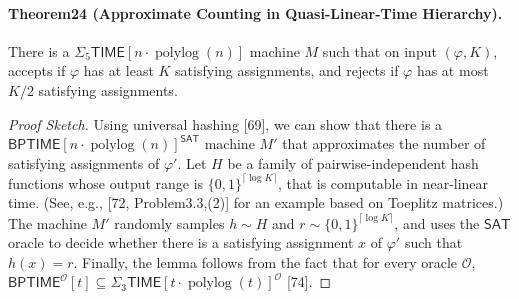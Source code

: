 \paragraph{Theorem24 (Approximate Counting in Quasi-Linear-Time Hierarchy).} There is a $\Sigma_5\mathsf{TIME}[n\cdot\operatorname{polylog}(n)]$ machine $M$ such that on input $(\varphi,K)$, accepts if $\varphi$ has at least $K$ satisfying assignments, and rejects if $\varphi$ has at most $K/2$ satisfying assignments.
\begin{proof}[Proof Sketch]
Using universal hashing [69], we can show that there is a $\mathsf{BPTIME}[n\cdot\operatorname{polylog}(n)]^{\mathsf{SAT}}$ machine $M'$ that approximates the number of satisfying assignments of $\varphi'$. Let $H$ be a family of pairwise-independent hash functions whose output range is $\{0,1\}^{\lceil\log K\rceil}$, that is computable in near-linear time. (See, e.g., [72, Problem3.3,(2)] for an example based on Toeplitz matrices.) The machine $M'$ randomly samples $h\sim H$ and $r\sim\{0,1\}^{\lceil\log K\rceil}$, and uses the $\mathsf{SAT}$ oracle to decide whether there is a satisfying assignment $x$ of $\varphi'$ such that $h(x)=r$.
Finally, the lemma follows from the fact that for every oracle $\mathcal O$, $\mathsf{BPTIME}^{\mathcal O}[t]\subseteq\Sigma_3\mathsf{TIME}[t\cdot\operatorname{polylog}(t)]^{\mathcal O}$ [74].
\end{proof}

